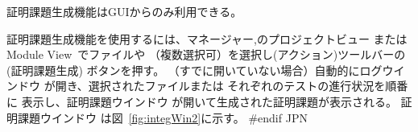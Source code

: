 \documentclass[\pformat,12pt]{article}
\newcommand{\vdmModView}{\guicmd{Module View}}
\newcommand{\vdmModView}{\guicmd{モジュールビュー}}
\newcommand{\vdmModView}{\guicmd{VDM View}}
\newcommand{\vdmModView}{\guicmd{VDMビュー}}
\newcommand{\guicmd}[1]{{\sf #1}}
\newcommand{\guicmd}[1]{{\gt #1}}
\begin{document}
証明課題生成機能はGUIからのみ利用できる。

証明課題生成機能を使用するには、\guicmd{マネージャー},の\guicmd{プロジェクトビュー} または
\vdmModView\ でファイルや
 （複数選択可）を選択し(\guicmd{アクション})ツールバーの 
(\guicmd{証明課題生成}) ボタンを押す。 （すでに開いていない場合）自動的に\guicmd{ログウインドウ} 
が開き、選択されたファイルまたは
 それぞれのテストの進行状況を順番に
表示し、\guicmd{証明課題ウインドウ} が開いて生成された証明課題が表示される。
\guicmd{証明課題ウインドウ} は図~\ref{fig:integWin2}に示す。
#endif JPN
\end{document}
